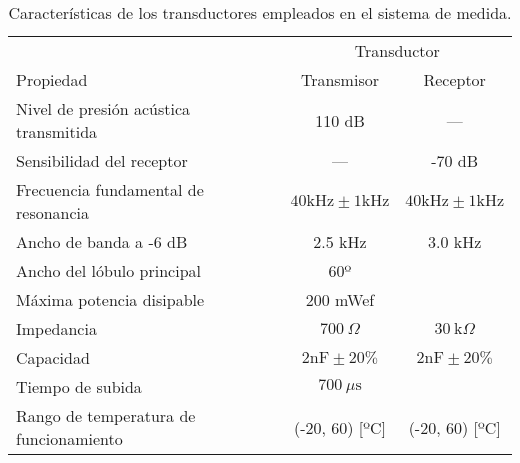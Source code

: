\begin{sidewaystable}
	\centering
	\begin{threeparttable}
	\begin{tabular}{l c c}
		\toprule
		& \multicolumn{2}{c}{Transductor} \\
		\cmidrule(l){2-3}
		Propiedad & Transmisor & Receptor \\
		\midrule
		Nivel de presión acústica transmitida & 110 dB & --- \\
		Sensibilidad del receptor & --- & -70 dB \\
		Frecuencia fundamental de resonancia
		& $40 \text{kHz} \pm 1 \text{kHz}$
		& $40 \text{kHz} \pm 1 \text{kHz}$ \\
		Ancho de banda a -6 dB & 2.5 kHz & 3.0 kHz \\
		Ancho del lóbulo principal & 60º & \\
		Máxima potencia disipable & 200 mWef & \\
		Impedancia & $700\ \Omega$ & $30\ \text{k}\Omega$ \\
		Capacidad & $2 \text{nF} \pm 20\%$
		& $2 \text{nF} \pm 20\%$ \\
		Tiempo de subida & $700\ \mu\text{s}$ & \\
		Rango de temperatura de funcionamiento %
		& (-20, 60) [ºC] & (-20, 60) [ºC] \\
		\bottomrule
	\end{tabular}
	\begin{TableNotes}
	\end{TableNotes}
	\end{threeparttable}
	\caption[Características de los transductores empleados en el
	sistema de medida]{Características de los transductores empleados
	en el sistema de medida.}
	\label{tab:transducers}
\end{sidewaystable}

